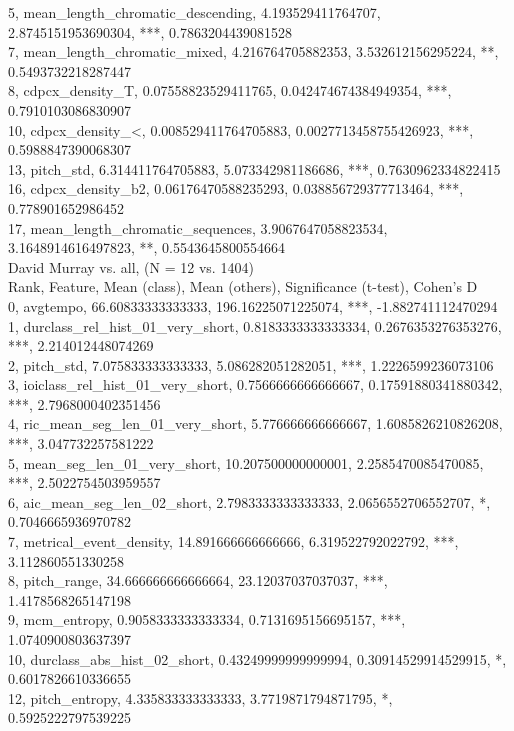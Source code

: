 5, mean_length_chromatic_descending, 4.193529411764707, 2.8745151953690304, ***, 0.7863204439081528\\
7, mean_length_chromatic_mixed, 4.216764705882353, 3.532612156295224, **, 0.5493732218287447\\
8, cdpcx_density_T, 0.07558823529411765, 0.042474674384949354, ***, 0.7910103086830907\\
10, cdpcx_density_<, 0.008529411764705883, 0.0027713458755426923, ***, 0.5988847390068307\\
13, pitch_std, 6.314411764705883, 5.073342981186686, ***, 0.7630962334822415\\
16, cdpcx_density_b2, 0.06176470588235293, 0.038856729377713464, ***, 0.778901652986452\\
17, mean_length_chromatic_sequences, 3.9067647058823534, 3.1648914616497823, **, 0.5543645800554664\\
David Murray vs. all, (N = 12 vs. 1404)\\
Rank, Feature, Mean (class), Mean (others), Significance (t-test), Cohen's D\\
0, avgtempo, 66.60833333333333, 196.16225071225074, ***, -1.882741112470294\\
1, durclass_rel_hist_01_very_short, 0.8183333333333334, 0.2676353276353276, ***, 2.214012448074269\\
2, pitch_std, 7.075833333333333, 5.086282051282051, ***, 1.2226599236073106\\
3, ioiclass_rel_hist_01_very_short, 0.7566666666666667, 0.17591880341880342, ***, 2.7968000402351456\\
4, ric_mean_seg_len_01_very_short, 5.776666666666667, 1.6085826210826208, ***, 3.047732257581222\\
5, mean_seg_len_01_very_short, 10.207500000000001, 2.2585470085470085, ***, 2.5022754503959557\\
6, aic_mean_seg_len_02_short, 2.7983333333333333, 2.0656552706552707, *, 0.7046665936970782\\
7, metrical_event_density, 14.891666666666666, 6.319522792022792, ***, 3.112860551330258\\
8, pitch_range, 34.666666666666664, 23.12037037037037, ***, 1.4178568265147198\\
9, mcm_entropy, 0.9058333333333334, 0.7131695156695157, ***, 1.0740900803637397\\
10, durclass_abs_hist_02_short, 0.43249999999999994, 0.30914529914529915, *, 0.6017826610336655\\
12, pitch_entropy, 4.335833333333333, 3.7719871794871795, *, 0.5925222797539225\\
